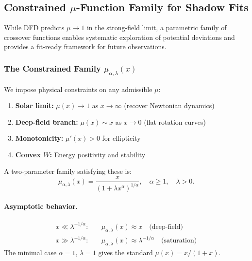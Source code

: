 \subsection{Constrained $\mu$-Function Family for Shadow Fits}\label{sec:strong-mu-family}

While DFD predicts $\mu \to 1$ in the strong-field limit, a parametric family 
of crossover functions enables systematic exploration of potential deviations 
and provides a fit-ready framework for future observations.

\subsubsection{The Constrained Family $\mu_{\alpha,\lambda}(x)$}

We impose physical constraints on any admissible $\mu$:
\begin{enumerate}
\item \textbf{Solar limit:} $\mu(x) \to 1$ as $x \to \infty$ (recover Newtonian dynamics)
\item \textbf{Deep-field branch:} $\mu(x) \sim x$ as $x \to 0$ (flat rotation curves)
\item \textbf{Monotonicity:} $\mu'(x) > 0$ for ellipticity
\item \textbf{Convex $W$:} Energy positivity and stability
\end{enumerate}

A two-parameter family satisfying these is:
\begin{equation}
\boxed{\mu_{\alpha,\lambda}(x) = \frac{x}{(1 + \lambda x^\alpha)^{1/\alpha}}}, \quad \alpha \geq 1, \quad \lambda > 0.
\label{eq:mu-constrained}
\end{equation}

\paragraph{Asymptotic behavior.}
\begin{align}
x \ll \lambda^{-1/\alpha}: \quad &\mu_{\alpha,\lambda}(x) \approx x \quad \text{(deep-field)} \\
x \gg \lambda^{-1/\alpha}: \quad &\mu_{\alpha,\lambda}(x) \approx \lambda^{-1/\alpha} \quad \text{(saturation)}
\end{align}
The minimal case $\alpha = 1$, $\lambda = 1$ gives the standard $\mu(x) = x/(1+x)$.

